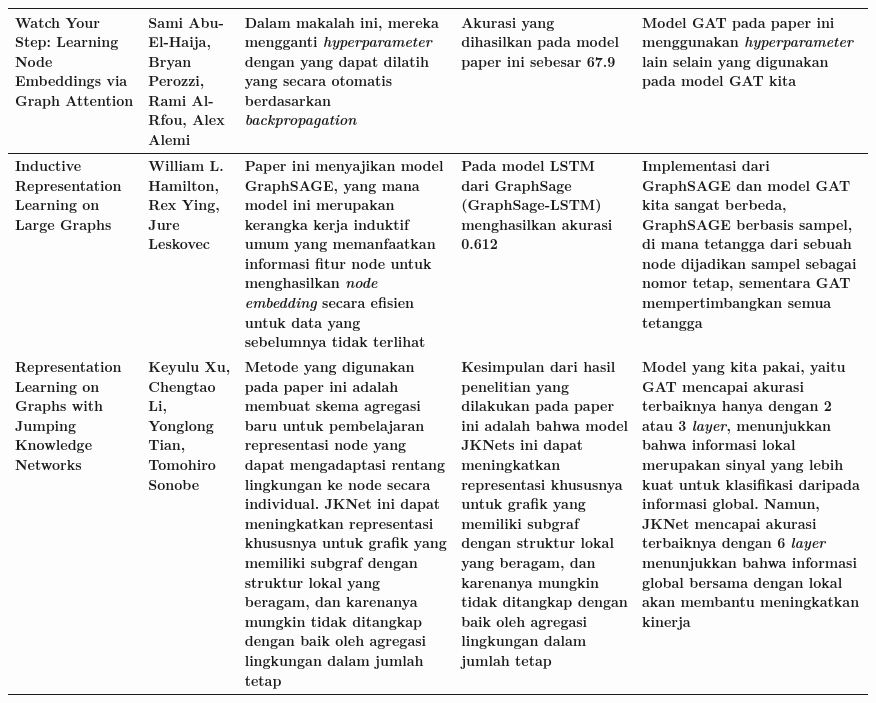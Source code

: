 \documentclass{article}
\begin{document}
\begin{center}
\begin{tabular}{m{3cm}|m{3cm}|m{3cm}|m{3cm}|m{3cm}}
\hline
\textbf{Watch Your Step: Learning Node Embeddings via Graph Attention\cite{cite24}} & \textbf{Sami Abu-El-Haija, Bryan Perozzi, Rami Al-Rfou, Alex Alemi} & \textbf{Dalam makalah ini, mereka mengganti \textit{hyperparameter} dengan yang dapat dilatih yang secara otomatis berdasarkan \textit{backpropagation}} & \textbf{Akurasi yang dihasilkan pada model paper ini sebesar 67.9} & \textbf{Model GAT pada paper ini menggunakan \textit{hyperparameter} lain selain yang digunakan pada model GAT kita} \\
\hline
\textbf{Inductive Representation Learning on Large Graphs\cite{cite6}} & \textbf{William L. Hamilton, Rex Ying, Jure Leskovec} & \textbf{Paper ini  menyajikan model GraphSAGE, yang mana model ini merupakan kerangka kerja induktif umum yang memanfaatkan informasi fitur node untuk menghasilkan \textit{node embedding} secara efisien untuk data yang sebelumnya tidak terlihat} & \textbf{Pada model LSTM dari GraphSage (GraphSage-LSTM) menghasilkan akurasi 0.612} & \textbf{Implementasi dari GraphSAGE dan model GAT kita sangat berbeda, GraphSAGE berbasis sampel, di mana tetangga dari sebuah node dijadikan sampel sebagai nomor tetap, sementara GAT mempertimbangkan semua tetangga} \\
\hline
\textbf{Representation Learning on Graphs with Jumping Knowledge Networks\cite{cite25}} & \textbf{Keyulu Xu, Chengtao Li, Yonglong Tian, Tomohiro Sonobe} & \textbf{Metode yang digunakan pada paper ini adalah membuat skema agregasi baru untuk pembelajaran representasi node yang dapat mengadaptasi rentang lingkungan ke node secara individual. JKNet ini dapat meningkatkan representasi khususnya untuk grafik yang memiliki subgraf dengan struktur lokal yang beragam, dan karenanya mungkin tidak ditangkap dengan baik oleh agregasi lingkungan dalam jumlah tetap} & \textbf{Kesimpulan dari hasil penelitian yang dilakukan pada paper ini adalah bahwa model JKNets ini dapat meningkatkan representasi khususnya untuk grafik yang memiliki subgraf dengan struktur lokal yang beragam, dan karenanya mungkin tidak ditangkap dengan baik oleh agregasi lingkungan dalam jumlah tetap} & \textbf{Model yang kita pakai, yaitu GAT mencapai akurasi terbaiknya hanya dengan 2 atau 3 \textit{layer}, menunjukkan bahwa informasi lokal merupakan sinyal yang lebih kuat untuk klasifikasi daripada informasi global. Namun, JKNet mencapai akurasi terbaiknya dengan 6 \textit{layer} menunjukkan bahwa informasi global bersama dengan lokal akan membantu meningkatkan kinerja} \\

\end{tabular}
\end{center}
\end{document}
